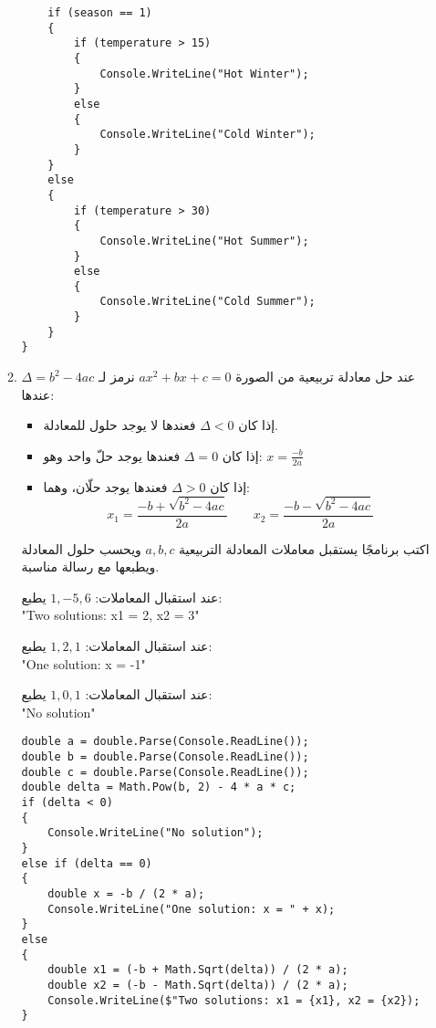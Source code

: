 \documentclass[12pt, twoside]{article}
\begin{document}
\begin{enumerate}[itemsep=3em]
\begin{enumerate}
\begin{boxSolution}
\begin{english}
\begin{verbatim}
    if (season == 1)
    {
        if (temperature > 15)
        {
            Console.WriteLine("Hot Winter");
        }
        else
        {
            Console.WriteLine("Cold Winter");
        }
    }
    else
    {
        if (temperature > 30)
        {
            Console.WriteLine("Hot Summer");
        }
        else
        {
            Console.WriteLine("Cold Summer");
        }
    }
}
\end{verbatim}
\end{english}
\end{boxSolution}
\fi
\clearpage
\fi

\item
عند حل معادلة تربيعية من الصورة $ax^2 + bx + c = 0$
نرمز لـ $\Delta = b^2 - 4ac$ عندها:
\begin{itemize}
    \item إذا كان $\Delta < 0$ فعندها لا يوجد حلول للمعادلة.
    \item إذا كان $\Delta = 0$ فعندها يوجد حلّ واحد وهو:
    \( x = \frac{-b}{2a} \)
    \item إذا كان $\Delta > 0$ فعندها يوجد حلّان، وهما:
    \[ x_1 = \frac{-b + \sqrt{b^2 - 4ac}}{2a} \qquad x_2 = \frac{-b - \sqrt{b^2 - 4ac}}{2a} \]
\end{itemize}%

 اكتب برنامجًا يستقبل معاملات المعادلة التربيعية $a,b,c$ ويحسب حلول المعادلة ويطبعها مع رسالة مناسبة.

 \ifdetailed
 \begin{boxExample}[1]
 عند استقبال المعاملات: $1, -5, 6$ يطبع: \\ "\textenglish{Two solutions: x1 = 2, x2 = 3}"
 \end{boxExample}
 \begin{boxExample}[2]
 عند استقبال المعاملات: $1, 2, 1$ يطبع: \\ "\textenglish{One solution: x = -1}"
 \end{boxExample}
 \begin{boxExample}[3]
 عند استقبال المعاملات: $1, 0, 1$ يطبع: \\ "\textenglish{No solution}"
 \end{boxExample}

\ifwithsols
\begin{boxSolution}
\begin{english}
\begin{verbatim}
double a = double.Parse(Console.ReadLine());
double b = double.Parse(Console.ReadLine());
double c = double.Parse(Console.ReadLine());
double delta = Math.Pow(b, 2) - 4 * a * c;
if (delta < 0)
{
    Console.WriteLine("No solution");
}
else if (delta == 0)
{
    double x = -b / (2 * a);
    Console.WriteLine("One solution: x = " + x);
}
else
{
    double x1 = (-b + Math.Sqrt(delta)) / (2 * a);
    double x2 = (-b - Math.Sqrt(delta)) / (2 * a);
    Console.WriteLine($"Two solutions: x1 = {x1}, x2 = {x2});
}
\end{verbatim}
\end{english}
\end{boxSolution}
\clearpage
\fi
\fi



\end{enumerate}
\end{enumerate}
\end{document}
